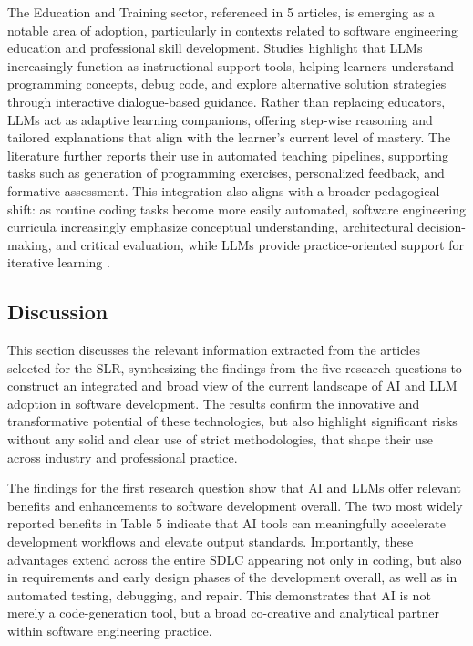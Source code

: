 The Education and Training sector, referenced in 5 articles, is emerging as a notable area of adoption, particularly in contexts related to software engineering education and professional skill development. Studies highlight that LLMs increasingly function as instructional support tools, helping learners understand programming concepts, debug code, and explore alternative solution strategies through interactive dialogue-based guidance. Rather than replacing educators, LLMs act as adaptive learning companions, offering step-wise reasoning and tailored explanations that align with the learner’s current level of mastery. The literature further reports their use in automated teaching pipelines, supporting tasks such as generation of programming exercises, personalized feedback, and formative assessment. This integration also aligns with a broader pedagogical shift: as routine coding tasks become more easily automated, software engineering curricula increasingly emphasize conceptual understanding, architectural decision-making, and critical evaluation, while LLMs provide practice-oriented support for iterative learning \cite{Ramos:2025aa, Zhang:2025ea, Hemmat:2025rd, Hou:2025cl, Zamfiroiu:2025ec}.

\subsection{Discussion}

This section discusses the relevant information extracted from the articles selected for the SLR, synthesizing the findings from the five research questions to construct an integrated and broad view of the current landscape of AI and LLM adoption in software development. The results confirm the innovative and transformative potential of these technologies, but also highlight significant risks without any solid and clear use of strict methodologies, that shape their use across industry and professional practice.

The findings for the first research question show that AI and LLMs offer relevant benefits and enhancements to software development overall. The two most widely reported benefits in Table 5 indicate that AI tools can meaningfully accelerate development workflows and elevate output standards. Importantly, these advantages extend across the entire SDLC appearing not only in coding, but also in requirements and early design phases of the development overall, as well as in automated testing, debugging, and repair. This demonstrates that AI is not merely a code-generation tool, but a broad co-creative and analytical partner within software engineering practice. 

